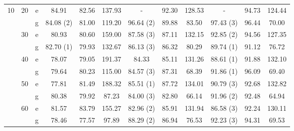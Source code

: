 \documentclass[10pt,a4paper]{elsarticle}
\begin{document}
\begin{table}[!h]
{\begin{tabular}{|c|c|c||ccc|ccc|ccc|}
					\hline
					\multirow{10}[10]{*}{10} & \multirow{2}[2]{*}{20} & e     & 	84.91  & 82.56 & 137.93 & \textcolor[rgb]{ 1,  0,  0}{ - } & 92.30 & 128.53 & \textcolor[rgb]{ 1,  0,  0}{ -} & 94.73 & 124.44 \bigstrut[t]\\
					&       & g     & \textcolor[rgb]{ 1,  0,  0}{ 84.08 (2) } & 81.00 & 119.20 & \textcolor[rgb]{ 1,  0,  0}{ 96.64 (2) } & 89.88 & 83.50 & \textcolor[rgb]{ 1,  0,  0}{ 97.43 (3)} & 96.44 & 70.00 \bigstrut[b]\\
					\cline{2-12}          & \multirow{2}[2]{*}{30} & e     &  80.93  & 80.60 & 159.00 & \textcolor[rgb]{ 1,  0,  0}{ 87.58 (3) } & 87.11 & 132.15 & \textcolor[rgb]{ 1,  0,  0}{ 92.85 (2)} & 94.56 & 127.35 \bigstrut[t]\\
					&       & g     & \textcolor[rgb]{ 1,  0,  0}{ 82.70 (1) } & 79.93 & 132.67 & \textcolor[rgb]{ 1,  0,  0}{ 86.13 (3) } & 86.32 & 80.29 & \textcolor[rgb]{ 1,  0,  0}{	89.74 (1)} & 91.12 & 76.72 \bigstrut[b]\\
					\cline{2-12}          & \multirow{2}[2]{*}{40} & e     &  78.07  & 79.05 & 191.37 & 	84.33  & 85.11 & 131.26 & \textcolor[rgb]{ 1,  0,  0}{ 88.61 (1)} & 91.88 & 132.10 \bigstrut[t]\\
					&       & g     &  79.64  & 80.23 & 115.00 & \textcolor[rgb]{ 1,  0,  0}{ 84.57 (3) } & 87.31 & 68.39 & \textcolor[rgb]{ 1,  0,  0}{	91.86 (1)} & 96.09 & 69.40 \bigstrut[b]\\
					\cline{2-12}          & \multirow{2}[2]{*}{50} & e     &  77.81  & 81.49 & 188.32 & \textcolor[rgb]{ 1,  0,  0}{	85.51 (1) } & 87.72 & 134.01 & \textcolor[rgb]{ 1,  0,  0}{ 90.79 (3)} & 92.68 & 132.82 \bigstrut[t]\\
					&       & g     & 	80.38  & 79.92 & 87.23 & \textcolor[rgb]{ 1,  0,  0}{84.00 (3)} & 82.80 & 66.14 & \textcolor[rgb]{ 1,  0,  0}{	91.96 (2)} & 92.48 & 64.94 \bigstrut[b]\\
					\cline{2-12}          & \multirow{2}[2]{*}{60} & e     &  81.57  & 83.79 & 155.27 & \textcolor[rgb]{ 1,  0,  0}{	82.96 (2) } & 85.91 & 131.94 & \textcolor[rgb]{ 1,  0,  0}{ 86.58 (3)} & 92.24 & 130.11 \bigstrut[t]\\
					&       & g     & 	78.46  & 77.57 & 97.89 & \textcolor[rgb]{ 1,  0,  0}{	88.29 (2) } & 86.94 & 76.53 & \textcolor[rgb]{ 1,  0,  0}{	92.23 (3)} & 94.31 & 69.53 \bigstrut[b]\\
					\hline
			\end{tabular}}%
			\label{table:apptab2}%
		\end{table}%
		
\end{document}
